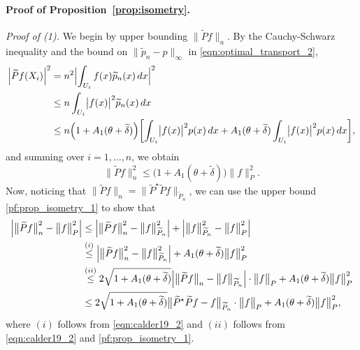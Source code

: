 \documentclass[twoside]{article}
\newcommand{\1}{\mathbf{1}}
\newcommand{\wt}[1]{\widetilde{#1}}
\theoremstyle{definition}
\theoremstyle{remark}
\begin{document}
\paragraph{Proof of Proposition~\ref{prop:isometry}.}
\textit{Proof of (1).}
We begin by upper bounding $\bigl\|\wt{P}f\bigr\|_{n}$. By the Cauchy-Schwarz inequality and the bound on $\|\wt{p}_n - p\|_{\infty}$ in \eqref{eqn:optimal_transport_2},
\begin{align*}
\Bigl|\wt{P}f(X_i)\Bigr|^2 & = n^2 \Bigl|\int_{U_i} f(x) \wt{p}_n(x) \,dx\Bigr|^2 \\
& \leq n \int_{U_i} \bigl|f(x)\bigr|^2 \wt{p}_n(x) \,dx \\
& \leq n \Bigl(1 + A_1(\theta + \wt{\delta})\Bigr)\biggl[\int_{U_i} \bigl|f(x)\bigr|^2 p(x) \,dx + A_1(\theta + \wt{\delta}) \int_{U_i} \bigl|f(x)\bigr|^2 p(x) \,dx\biggr],
\end{align*}
and summing over $i = 1,\ldots,n$, we obtain
\begin{equation}
\label{pf:prop_isometry_1}
\bigl\|\wt{P}f\bigr\|_{n}^2 \leq \biggl(1 + A_1(\theta + \wt{\delta})\biggr) \bigl\|f\bigr\|_{P}^2.
\end{equation}
Now, noticing that $\bigl\|\wt{P}f\bigr\|_{n} = \bigl\|\wt{P}^{\star}\wt{P}f\bigr\|_{\wt{P}_n}$, we can use the upper bound \eqref{pf:prop_isometry_1} to show that
\begin{align}
\Bigl|\bigl\|\wt{P}f\bigr\|_{n}^2 - \bigl\|f\bigr\|_{P}^2\Bigr| & \leq \Bigl|\bigl\|\wt{P}f\bigr\|_{n}^2 - \bigl\|f\bigr\|_{\wt{P}_n}^2\Bigr| + \Bigl|\bigl\|f\bigr\|_{\wt{P}_n}^2 - \bigl\|f\bigr\|_{P}^2\Bigr| \nonumber \\
& \overset{(i)}{\leq} \Bigl|\bigl\|\wt{P}f\bigr\|_{n}^2 - \bigl\|f\bigr\|_{\wt{P}_n}^2\Bigr|  + A_1(\theta + \wt{\delta}) \bigl\|f\bigr\|_{P}^2 \\
& \overset{(ii)}{\leq} 2 \sqrt{1 + A_1(\theta + \wt{\delta})} \Bigl|\bigl\|\wt{P}f\bigr\|_{n} - \bigl\|f\bigr\|_{\wt{P}_n}\Bigr| \cdot \bigl\|f\bigr\|_{P} + A_1(\theta + \wt{\delta}) \bigl\|f\bigr\|_{P}^2 \nonumber \\
& \leq 2 \sqrt{1 + A_1(\theta + \wt{\delta})} \bigl\|\wt{P}^{\star}\wt{P}f - f\bigr\|_{\wt{P}_n} \cdot \bigl\|f\bigr\|_{P} + A_1(\theta + \wt{\delta}) \bigl\|f\bigr\|_{P}^2, \label{pf:prop_isometry_2}
\end{align}
where $(i)$ follows from \eqref{eqn:calder19_2} and $(ii)$ follows from \eqref{eqn:calder19_2} and  \eqref{pf:prop_isometry_1}. 
\end{document}
